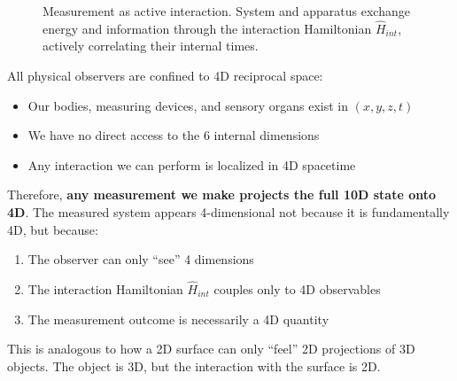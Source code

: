 \begin{figure}[htbp]
\centering
{}
\caption{Measurement as active interaction. System and apparatus exchange energy and information through the interaction Hamiltonian $\hat{H}_{int}$, actively correlating their internal times.}
\label{fig:active_interaction}
\end{figure}

\begin{insight}
All physical observers are confined to 4D reciprocal space:
\begin{itemize}
    \item Our bodies, measuring devices, and sensory organs exist in $(x, y, z, t)$
    \item We have no direct access to the 6 internal dimensions
    \item Any interaction we can perform is localized in 4D spacetime
\end{itemize}

Therefore, \textbf{any measurement we make projects the full 10D state onto 4D}. The measured system appears 4-dimensional not because it is fundamentally 4D, but because:
\begin{enumerate}
    \item The observer can only ``see'' 4 dimensions
    \item The interaction Hamiltonian $\hat{H}_{int}$ couples only to 4D observables
    \item The measurement outcome is necessarily a 4D quantity
\end{enumerate}

This is analogous to how a 2D surface can only ``feel'' 2D projections of 3D objects. The object is 3D, but the interaction with the surface is 2D.
\end{insight}

